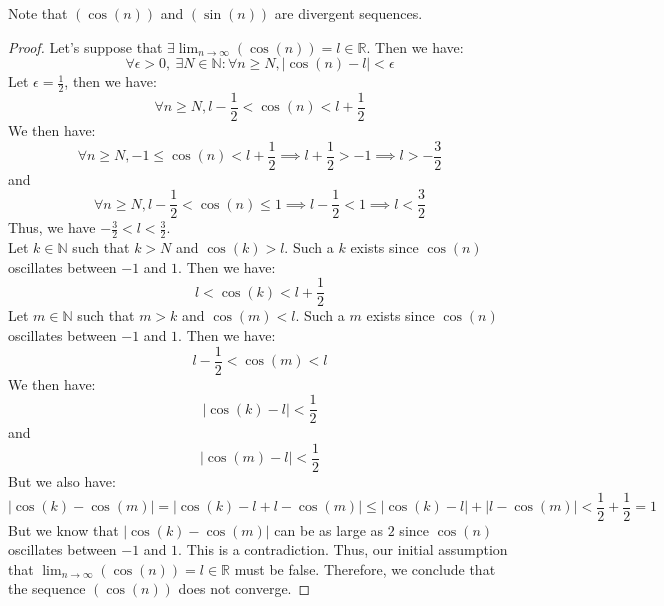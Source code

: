 Note that $(\cos (n))$ and $(\sin (n))$ are divergent sequences.
\begin{proof}
    Let's suppose that $\exists \lim_{n \to \infty} (\cos (n)) = l \in \mathbb{R}$. Then we have:
    \[ \forall \epsilon > 0, \ \exists N \in \mathbb{N} : \forall n \geq N, |\cos (n) - l| < \epsilon \]
    Let $\epsilon = \frac{1}{2}$, then we have:
    \[ \forall n \geq N, l - \frac{1}{2} < \cos (n) < l + \frac{1}{2} \]
    We then have:
    \[ \forall n \geq N, -1 \leq \cos (n) < l + \frac{1}{2} \implies l + \frac{1}{2} > -1 \implies l > -\frac{3}{2} \]
    and
    \[ \forall n \geq N, l - \frac{1}{2} < \cos (n) \leq 1 \implies l - \frac{1}{2} < 1 \implies l < \frac{3}{2} \]
    Thus, we have $-\frac{3}{2} < l < \frac{3}{2}$. \\
    Let $k \in \mathbb{N}$ such that $k > N$ and $\cos (k) > l$. Such a $k$ exists since $\cos (n)$ oscillates between $-1$ and $1$. Then we have:
    \[ l < \cos (k) < l + \frac{1}{2} \]
    Let $m \in \mathbb{N}$ such that $m > k$ and $\cos (m) < l$. Such a $m$ exists since $\cos (n)$ oscillates between $-1$ and $1$. Then we have:
    \[ l - \frac{1}{2} < \cos (m) < l \]
    We then have:
    \[ |\cos (k) - l| < \frac{1}{2} \]
    and
    \[ |\cos (m) - l| < \frac{1}{2} \]
    But we also have:
    \[ |\cos (k) - \cos (m)| = |\cos (k) - l + l - \cos (m)| \leq |\cos (k) - l| + |l - \cos (m)| < \frac{1}{2} + \frac{1}{2} = 1 \]
    But we know that $|\cos (k) - \cos (m)|$ can be as large as $2$ since $\cos (n)$ oscillates between $-1$ and $1$. This is a contradiction. Thus, our initial assumption that $\lim_{n \to \infty} (\cos (n)) = l \in \mathbb{R}$ must be false. Therefore, we conclude that the sequence \( (\cos(n)) \) does not converge.
\end{proof}